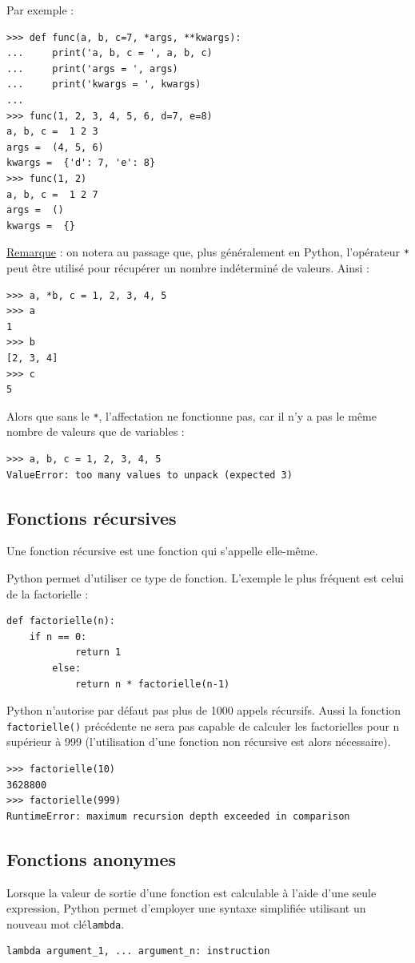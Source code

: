 \documentclass[12pt, a4paper]{article}
\begin{document}
Par exemple :
\begin{lstlisting}
>>> def func(a, b, c=7, *args, **kwargs):
...     print('a, b, c = ', a, b, c)
...     print('args = ', args)
...     print('kwargs = ', kwargs)
...
>>> func(1, 2, 3, 4, 5, 6, d=7, e=8)
a, b, c =  1 2 3
args =  (4, 5, 6)
kwargs =  {'d': 7, 'e': 8}
>>> func(1, 2)
a, b, c =  1 2 7
args =  ()
kwargs =  {}
\end{lstlisting}


\underline{Remarque} : on notera au passage que, plus généralement en Python, l'opérateur \lstinline{*} peut être utilisé pour récupérer un nombre indéterminé de valeurs. Ainsi :
\begin{lstlisting}
>>> a, *b, c = 1, 2, 3, 4, 5
>>> a
1
>>> b
[2, 3, 4]
>>> c
5
\end{lstlisting}

Alors que sans le \lstinline{*}, l'affectation ne fonctionne pas, car il n'y a pas le même nombre de valeurs que de variables :
\begin{lstlisting}
>>> a, b, c = 1, 2, 3, 4, 5
ValueError: too many values to unpack (expected 3)
\end{lstlisting}


\subsection{Fonctions récursives}
Une fonction récursive est une fonction qui s'appelle elle-même.

Python permet d'utiliser ce type de fonction. L'exemple le plus fréquent est celui de la factorielle :
\begin{lstlisting}
def factorielle(n):
    if n == 0:
		    return 1
		else:
		    return n * factorielle(n-1)
\end{lstlisting}

Python n'autorise par défaut pas plus de 1000 appels récursifs. Aussi la fonction \lstinline{factorielle()} précédente ne sera pas capable de calculer les factorielles pour n supérieur à 999 (l'utilisation d'une fonction non récursive est alors nécessaire).
\begin{lstlisting}
>>> factorielle(10)
3628800
>>> factorielle(999)
RuntimeError: maximum recursion depth exceeded in comparison
\end{lstlisting}


\subsection{Fonctions anonymes}
Lorsque la valeur de sortie d'une fonction est calculable à l'aide d'une seule expression, Python permet d'employer une syntaxe simplifiée utilisant un nouveau mot clé\lstinline{lambda}.
\begin{lstlisting}
lambda argument_1, ... argument_n: instruction
\end{lstlisting}
\end{document}
